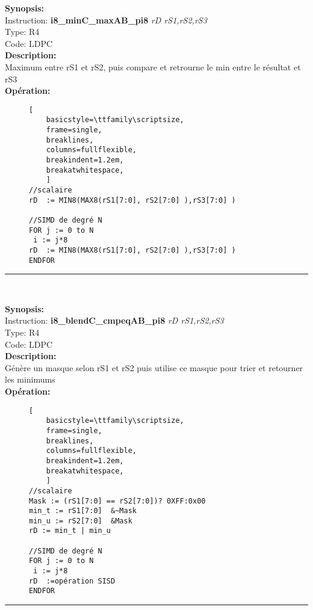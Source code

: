 {\scriptsize
\textbf{Synopsis:}\\
Instruction: \textbf{i8\_minC\_maxAB\_pi8 } \textit{rD rS1,rS2,rS3}\\
Type: R4\\
Code: LDPC\\
\textbf{Description:}\\
Maximum entre rS1 et rS2, puis compare et retrourne le min entre le résultat et rS3\\
\textbf{Opération:}\\
    \begin{figure}[H]
    \begin{lstlisting}[
    basicstyle=\ttfamily\scriptsize,
    frame=single,
    breaklines,
    columns=fullflexible,
    breakindent=1.2em,
    breakatwhitespace,
    ]
//scalaire
rD  := MIN8(MAX8(rS1[7:0], rS2[7:0] ),rS3[7:0] )
    
//SIMD de degré N
FOR j := 0 to N    
 i := j*8    
rD  := MIN8(MAX8(rS1[7:0], rS2[7:0] ),rS3[7:0] )
ENDFOR
\end{lstlisting}
\end{figure}
}
\rule{8cm}{0.4pt}\\
{\scriptsize
\textbf{Synopsis:}\\
Instruction: \textbf{i8\_blendC\_cmpeqAB\_pi8 } \textit{rD rS1,rS2,rS3}\\
Type: R4\\
Code: LDPC\\
\textbf{Description:}\\
Génère un masque selon rS1 et rS2 puis utilise ce masque pour trier et retourner les minimums \\
\textbf{Opération:}\\
    \begin{figure}[H]
    \begin{lstlisting}[
    basicstyle=\ttfamily\scriptsize,
    frame=single,
    breaklines,
    columns=fullflexible,
    breakindent=1.2em,
    breakatwhitespace,
    ]
//scalaire
Mask := (rS1[7:0] == rS2[7:0])? 0XFF:0x00
min_t := rS1[7:0]  &~Mask
min_u := rS2[7:0]  &Mask
rD := min_t | min_u
    
//SIMD de degré N
FOR j := 0 to N    
 i := j*8    
rD  :=opération SISD
ENDFOR
\end{lstlisting}
\end{figure}
}
\rule{8cm}{0.4pt}\\
